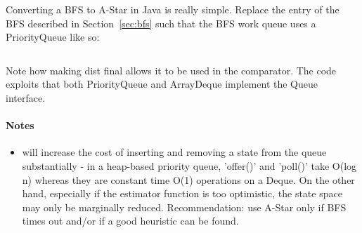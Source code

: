 Converting a BFS to A-Star in Java is really simple.  Replace the entry
of the BFS described in Section~\ref{sec:bfs} such that the BFS work
queue uses a PriorityQueue like so:

\inputminted[fontsize=\footnotesize,linenos=true]{java}{code/astar.java}

Note how making dist final allows it to be used in the comparator.
The code exploits that both PriorityQueue and ArrayDeque implement the
Queue interface.

\paragraph{Notes}  
\begin{itemize}
\item
\astar will increase the cost of inserting and removing a state from the queue
substantially - in a heap-based priority queue, 'offer()' and 'poll()' take O(log n) whereas 
they are constant time O(1) operations on a Deque.  On the other hand, especially if the
estimator function is too optimistic, the state space may only be marginally reduced.
Recommendation: use A-Star only if BFS times out and/or if a good heuristic
can be found.

\end{itemize}
